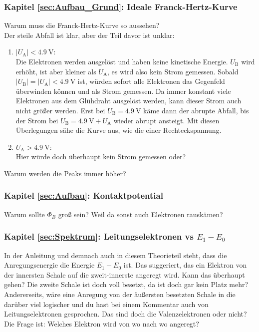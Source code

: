 \subsubsection*{Kapitel \ref{sec:Aufbau_Grund}: Ideale Franck-Hertz-Kurve}
Warum muss die Franck-Hertz-Kurve so aussehen? \\
Der steile Abfall ist klar, aber der Teil davor ist unklar: \\
\begin{enumerate}
	\item $|U_\text{A}|<\SI{4.9}{\volt}$: \\
	Die Elektronen werden ausgelöst und haben keine kinetische Energie. $U_\text{B}$ wird erhöht, ist aber kleiner als $U_\text{A}$, es wird also kein Strom gemessen. Sobald $|U_\text{B}|=|U_\text{A}|<\SI{4.9}{\volt}$ ist, würden sofort alle Elektronen das Gegenfeld überwinden können und als Strom gemessen. Da immer konstant viele Elektronen aus dem Glühdraht ausgelöst werden, kann dieser Strom auch nicht größer werden. Erst bei $U_\text{B}=\SI{4.9}{\volt}$ käme dann der abrupte Abfall, bis der Strom bei $U_\text{B}=\SI{4.9}{\volt}+U_\text{A}$ wieder abrupt ansteigt. Mit diesen Überlegungen sähe die  Kurve aus, wie die einer Rechteckspannung.
	\item $U_\text{A}>\SI{4.9}{\volt}$: \\
	Hier würde doch überhaupt kein Strom gemessen oder?
\end{enumerate}
Warum werden die Peaks immer höher?
\subsubsection*{Kapitel \ref{sec:Aufbau}: Kontaktpotential}
Warum sollte $\Phi_B$ groß sein? Weil da sonst auch Elektronen rauskämen?
\subsubsection*{Kapitel \ref{sec:Spektrum}: Leitungselektronen vs $E_1-E_0$}
In der Anleitung und demnach auch in diesem Theorieteil steht, dass die Anregungsenergie die Energie $E_1-E_0$ ist. Das suggeriert, das ein Elektron von der innersten Schale auf die zweit-innerste angeregt wird. Kann das überhaupt gehen? Die zweite Schale ist doch voll besetzt, da ist doch gar kein Platz mehr? Andererseits, wäre eine Anregung von der äußersten besetzten Schale in die darüber viel logischer und du hast bei einem Kommentar auch von Leitungselektronen gesprochen. Das sind doch die Valenzelektronen oder nicht? \\
Die Frage ist: Welches Elektron wird von wo nach wo angeregt?